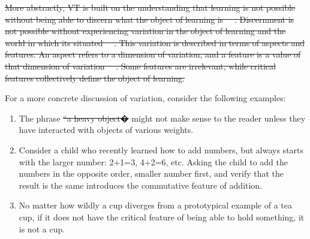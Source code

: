 \documentclass[12pt,twoside]{mitthesis}
\providecommand{\DIFaddtex}[1]{{\protect\color{blue}\uwave{#1}}} %
\providecommand{\DIFdeltex}[1]{{\protect\color{red}\sout{#1}}}                      %
\providecommand{\DIFaddbegin}{} %
\providecommand{\DIFaddend}{} %
\providecommand{\DIFdelbegin}{} %
\providecommand{\DIFdelend}{} %
\providecommand{\DIFadd}[1]{\texorpdfstring{\DIFaddtex{#1}}{#1}} %
\providecommand{\DIFdel}[1]{\texorpdfstring{\DIFdeltex{#1}}{}} %
\begin{document}
\DIFdelbegin \DIFdel{More abstractly, VT is built on the understanding that learning is not possible without being able to discern what the object of learning is~\mbox{%
\cite{marton1997learning}}%
. Discernment is not possible without experiencing variation in the object of learning and the world in which its situated~\mbox{%
\cite{marton2004classroom}}%
. This variation is described in terms of aspects and features. An aspect refers to a dimension of variation, and a feature is a value of that dimension of variation~\mbox{%
\cite{ling2012variation}}%
. Some features are irrelevant, while critical features collectively define the object of learning.
}\DIFdelend %

For a more concrete discussion of variation, consider the following examples:
 \begin{enumerate} 
\item The phrase \DIFdelbegin \DIFdel{“a heavy object�}\DIFdelend \DIFaddbegin {\it \DIFadd{a heavy object}} \DIFaddend might not make sense to the reader unless they have interacted with objects of various weights.
\item Consider a child who recently learned how to add numbers, but always starts with the larger number: 2+1=3, 4+2=6, etc. Asking the child to add the numbers in the opposite order, smaller number first, and verify that the result is the same introduces the commutative feature of addition.
\item No matter how wildly a cup diverges from a prototypical example of a tea cup, if it does not have the critical feature of being able to hold something, it is not a cup.
 \end{enumerate} 
\end{document}
